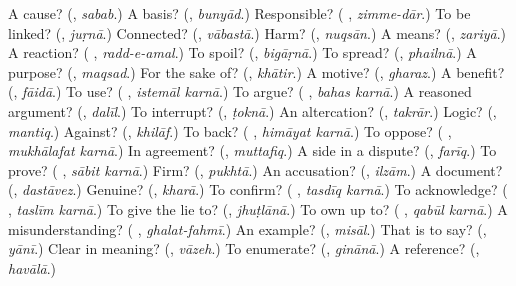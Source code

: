 \begin{tcolorbox}[breakable,colback=teal!4,colframe=teal!35!black,title={Before you move on}]
A cause? (\textbf{}, \emph{sabab}.) A basis? (\textbf{}, \emph{bunyād}.) Responsible? (\textbf{ }, \emph{zimme-dār}.) To be linked? (\textbf{}, \emph{juṛnā}.) Connected? (\textbf{}, \emph{vābastā}.) Harm? (\textbf{}, \emph{nuqsān}.) A means? (\textbf{}, \emph{zariyā}.) A reaction? (\textbf{ }, \emph{radd-e-amal}.) To spoil? (\textbf{}, \emph{bigāṛnā}.) To spread? (\textbf{}, \emph{phailnā}.) A purpose? (\textbf{}, \emph{maqsad}.) For the sake of? (\textbf{}, \emph{khātir}.) A motive? (\textbf{}, \emph{gharaz}.) A benefit? (\textbf{}, \emph{fāidā}.) To use? (\textbf{ }, \emph{istemāl karnā}.) To argue? (\textbf{ }, \emph{bahas karnā}.) A reasoned argument? (\textbf{}, \emph{dalīl}.) To interrupt? (\textbf{}, \emph{ṭoknā}.) An altercation? (\textbf{}, \emph{takrār}.) Logic? (\textbf{}, \emph{mantiq}.) Against? (\textbf{}, \emph{khilāf}.) To back? (\textbf{ }, \emph{himāyat karnā}.) To oppose? (\textbf{ }, \emph{mukhālafat karnā}.) In agreement? (\textbf{}, \emph{muttafiq}.) A side in a dispute? (\textbf{}, \emph{farīq}.) To prove? (\textbf{ }, \emph{sābit karnā}.) Firm? (\textbf{}, \emph{pukhtā}.) An accusation? (\textbf{}, \emph{ilzām}.) A document? (\textbf{}, \emph{dastāvez}.) Genuine? (\textbf{}, \emph{kharā}.) To confirm? (\textbf{ }, \emph{tasdīq karnā}.) To acknowledge? (\textbf{ }, \emph{taslīm karnā}.) To give the lie to? (\textbf{}, \emph{jhuṭlānā}.) To own up to? (\textbf{ }, \emph{qabūl karnā}.) A misunderstanding? (\textbf{ }, \emph{ghalat-fahmī}.) An example? (\textbf{}, \emph{misāl}.) That is to say? (\textbf{}, \emph{yānī}.) Clear in meaning? (\textbf{}, \emph{vāzeh}.) To enumerate? (\textbf{}, \emph{ginānā}.) A reference? (\textbf{}, \emph{havālā}.)
\end{tcolorbox}
